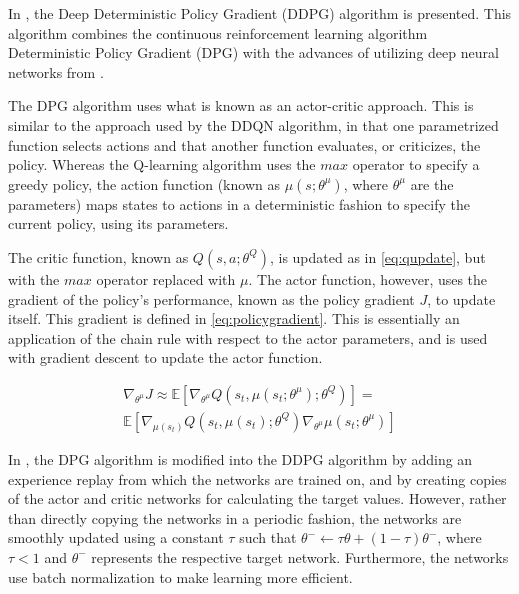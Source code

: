 \documentclass{kththesis}
\begin{document}
In \parencite{lillicrap2015continuous}, the Deep Deterministic Policy Gradient (DDPG) algorithm is presented. This algorithm combines the continuous reinforcement learning algorithm Deterministic Policy Gradient (DPG) with the advances of utilizing deep neural networks from \parencite{mnih2015human}.

The DPG algorithm uses what is known as an actor-critic approach. This is similar to the approach used by the DDQN algorithm, in that one parametrized function selects actions and that another function evaluates, or criticizes, the policy. Whereas the Q-learning algorithm uses the $max$ operator to specify a greedy policy, the action function (known as $\mu(s;\theta^\mu)$, where $\theta^\mu$ are the parameters) maps states to actions in a deterministic fashion to specify the current policy, using its parameters. 

The critic function, known as $Q(s, a; \theta^Q)$, is updated as in \autoref{eq:qupdate}, but with the $max$ operator replaced with $\mu$. The actor function, however, uses the gradient of the policy's performance, known as the policy gradient $J$, to update itself. This gradient is defined in \autoref{eq:policygradient}. This is essentially an application of the chain rule with respect to the actor parameters, and is used with gradient descent to update the actor function. \parencite{lillicrap2015continuous}

\begin{equation}
\label{eq:policygradient}
\begin{split}
\nabla_{\theta^\mu}J \approx \mathbb{E}[\nabla_{\theta^\mu}Q(s_t, \mu(s_t;\theta^\mu); \theta^Q)] = \\ \mathbb{E}[\nabla_{\mu(s_t)}Q(s_t, \mu(s_t); \theta^Q)\nabla_{\theta^\mu}\mu(s_t; \theta^\mu)]
\end{split}
\end{equation}

In \parencite{lillicrap2015continuous}, the DPG algorithm is modified into the DDPG algorithm by adding an experience replay from which the networks are trained on, and by creating copies of the actor and critic networks for calculating the target values. However, rather than directly copying the networks in a periodic fashion, the networks are smoothly updated using a constant $\tau$ such that $\theta^- \leftarrow \tau\theta + (1-\tau)\theta^-$, where $\tau < 1$ and $\theta^-$ represents the respective target network. Furthermore, the networks use batch normalization to make learning more efficient. 
\end{document}
